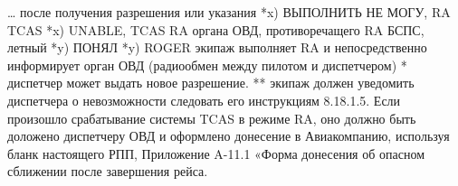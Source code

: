 … после получения разрешения или указания	*x) ВЫПОЛНИТЬ НЕ МОГУ, RA TCAS	*x) UNABLE, TCAS RA
органа ОВД, противоречащего RA БСПС, летный	*y) ПОНЯЛ	*y) ROGER
экипаж выполняет RA и непосредственно		
информирует орган ОВД (радиообмен между		
пилотом и диспетчером)		
* диспетчер может выдать новое разрешение.
** экипаж должен уведомить диспетчера о невозможности следовать его инструкциям
8.18.1.5. Если произошло срабатывание системы TCAS в режиме RA, оно должно быть доложено диспетчеру ОВД и оформлено донесение в Авиакомпанию, используя бланк настоящего РПП, Приложение A-11.1 «Форма донесения об опасном сближении после завершения рейса.
